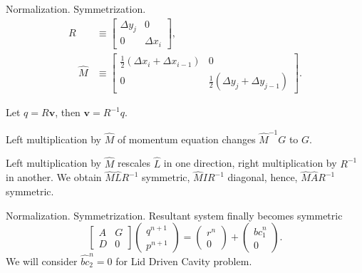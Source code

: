\documentclass{beamer}
\begin{document}
	\begin{frame}{Normalization. Symmetrization.}
	\begin{align*}
	R &\equiv\left[\begin{array}{cc}
	\Delta y_j & 0 \\
	0 & \Delta x_i
	\end{array}\right], \\
	\quad \hat{M} & \equiv\left[\begin{array}{cc}
	\frac{1}{2}\left(\Delta x_i+\Delta x_{i-1}\right) & 0 \\
	0 & \frac{1}{2}\left(\Delta y_j+\Delta y_{j-1}\right)
	\end{array}\right].
	\end{align*}
	
	Let $q=R\boldsymbol{v}$, then $\boldsymbol{v}=R^{-1}q$. 
	
	Left multiplication by $\hat{M}$ of momentum equation changes $\hat{M}^{-1}G$ to $G$.
	
	Left multiplication by $\hat{M}$ rescales $\hat{L}$ in one direction, right multiplication by $R^{-1}$ in another. We obtain $\hat{M}\hat{L}R^{-1}$ symmetric, $\hat{M}IR^{-1}$ diagonal, hence, $\hat{M}\hat{A}R^{-1}$ symmetric.
	\end{frame}
	
	\begin{frame}{Normalization. Symmetrization.}
	Resultant system finally becomes symmetric
		\begin{equation}\label{eqn:NSE-dsm-bl-system-nonint}
		\boxed{\begin{bmatrix}
			{A} & {G} \\
			{D} & 0
		\end{bmatrix}
		\begin{pmatrix}
			q^{n+1} \\ 
			p^{n+1}
		\end{pmatrix}
		=
		\begin{pmatrix}
			{r}^n \\
			0
		\end{pmatrix}
		+
		\begin{pmatrix}
			{bc}_1^n\\
			0
		\end{pmatrix}.}
		\end{equation}
		We will consider $\hat{bc}_2^n=0$ for Lid Driven Cavity problem. 
	\end{frame}

	


	
	
\end{document}
